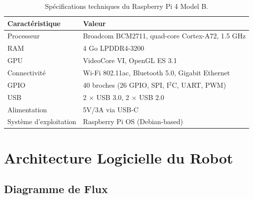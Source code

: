 \documentclass[12pt,a4paper,twoside]{report}
\begin{document}
\begin{table}[H]
\centering
\caption{Spécifications techniques du Raspberry Pi 4 Model B.}
\label{tab:rpi_specs}
\renewcommand{\arraystretch}{1.3}
\begin{tabular}{|l|l|}
\hline
\rowcolor{stellantisblue!15}
\textbf{Caractéristique} & \textbf{Valeur} \\
\hline
Processeur & Broadcom BCM2711, quad-core Cortex-A72, 1.5 GHz \\
\hline
RAM & 4 Go LPDDR4-3200 \\
\hline
GPU & VideoCore VI, OpenGL ES 3.1 \\
\hline
Connectivité & Wi-Fi 802.11ac, Bluetooth 5.0, Gigabit Ethernet \\
\hline
GPIO & 40 broches (26 GPIO, SPI, I$^2$C, UART, PWM) \\
\hline
USB & 2 $\times$ USB 3.0, 2 $\times$ USB 2.0 \\
\hline
Alimentation & 5V/3A via USB-C \\
\hline
Système d'exploitation & Raspberry Pi OS (Debian-based) \\
\hline
\end{tabular}
\end{table}

\section{Architecture Logicielle du Robot}

\subsection{Diagramme de Flux}
\end{document}
